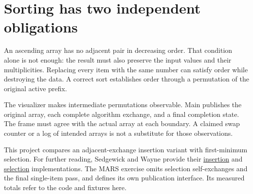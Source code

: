 \section{Sorting has two independent
  obligations}\label{009-sorting-visualizer-p00-sorting-has-two-independent-obligations}

An ascending array has no adjacent pair in decreasing order. That
condition alone is not enough: the result must also preserve the input
values and their multiplicities. Replacing every item with the same
number can satisfy order while destroying the data. A correct sort
establishes order through a permutation of the original active prefix.

The visualizer makes intermediate permutations observable. Main
publishes the original array, each complete algorithm exchange, and a
final completion state. The frame must agree with the actual array at
each boundary. A claimed swap counter or a log of intended arrays is not
a substitute for those observations.

This project compares an adjacent-exchange insertion variant with
first-minimum selection. For further reading, Sedgewick and Wayne
provide their
\href{https://raw.githubusercontent.com/kevin-wayne/algs4/master/src/main/java/edu/princeton/cs/algs4/Insertion.java}{insertion}
and
\href{https://raw.githubusercontent.com/kevin-wayne/algs4/master/src/main/java/edu/princeton/cs/algs4/Selection.java}{selection}
implementations. The MARS exercise omits selection self-exchanges and
the final single-item pass, and defines its own publication interface.
Its measured totals refer to the code and fixtures here.
